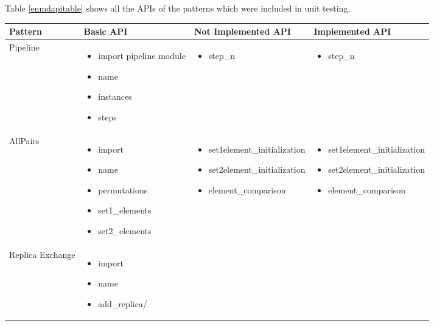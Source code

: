 \documentclass[10pt]{ruthesis}
\begin{document}
Table \ref{enmdapitable} shows all the APIs of the patterns which were included in unit testing.

\begin{table}
\begin{center}
\begin{tabular}{|p{2cm}|p{3cm}|p{5cm}|p{5cm}|}
\hline
\rule{0pt}{15pt} \textbf{Pattern} & \textbf{Basic API} & \textbf{Not Implemented API} & \textbf{Implemented API} \\[2ex]
\hline
Pipeline & 
	\begin{itemize}
	\item import pipeline module
	\item name
	\item instances
	\item steps
	\end{itemize}
	& 
	\begin{itemize}
		\item step\_n
	\end{itemize}
	& 
	\begin{itemize}
		\item step\_n
	\end{itemize}
	\\
\hline
AllPairs &
	\begin{itemize}
	\item import
	\item name
	\item permutations
	\item set1\_elements
	\item set2\_elements
	\end{itemize}
	&
	\begin{itemize}
	\item set1element\_initialization
	\item set2element\_initialization
	\item element\_comparison 
	\end{itemize}
	&
	\begin{itemize}
	\item set1element\_initialization
	\item set2element\_initialization
	\item element\_comparison 
	\end{itemize}
	\\
\hline
Replica Exchange &
	\begin{itemize}
	\item import
	\item name
	\item add\_replica/

\end{itemize}
\end{tabular}
\end{center}
\end{table}
\end{document}
